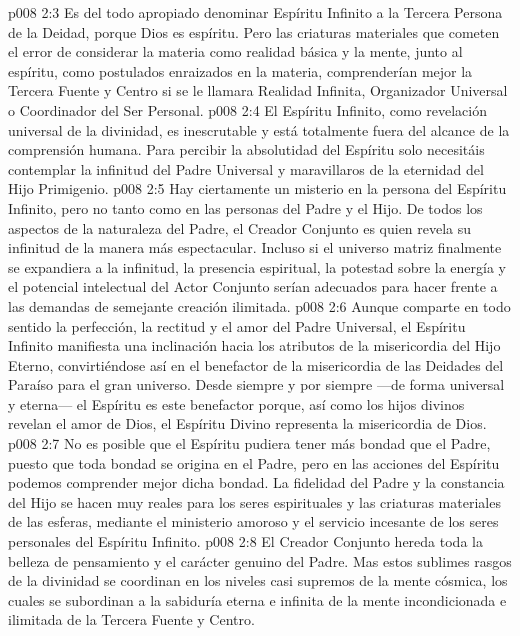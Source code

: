 \vs p008 2:3 Es del todo apropiado denominar Espíritu Infinito a la Tercera Persona de la Deidad, porque Dios es espíritu. Pero las criaturas materiales que cometen el error de considerar la materia como realidad básica y la mente, junto al espíritu, como postulados enraizados en la materia, comprenderían mejor la Tercera Fuente y Centro si se le llamara Realidad Infinita, Organizador Universal o Coordinador del Ser Personal.
\vs p008 2:4 \pc El Espíritu Infinito, como revelación universal de la divinidad, es inescrutable y está totalmente fuera del alcance de la comprensión humana. Para percibir la absolutidad del Espíritu solo necesitáis contemplar la infinitud del Padre Universal y maravillaros de la eternidad del Hijo Primigenio.
\vs p008 2:5 \pc Hay ciertamente un misterio en la persona del Espíritu Infinito, pero no tanto como en las personas del Padre y el Hijo. De todos los aspectos de la naturaleza del Padre, el Creador Conjunto es quien revela su infinitud de la manera más espectacular. Incluso si el universo matriz finalmente se expandiera a la infinitud, la presencia espiritual, la potestad sobre la energía y el potencial intelectual del Actor Conjunto serían adecuados para hacer frente a las demandas de semejante creación ilimitada.
\vs p008 2:6 Aunque comparte en todo sentido la perfección, la rectitud y el amor del Padre Universal, el Espíritu Infinito manifiesta una inclinación hacia los atributos de la misericordia del Hijo Eterno, convirtiéndose así en el benefactor de la misericordia de las Deidades del Paraíso para el gran universo. Desde siempre y por siempre ---de forma universal y eterna--- el Espíritu es este benefactor porque, así como los hijos divinos revelan el amor de Dios, el Espíritu Divino representa la misericordia de Dios.
\vs p008 2:7 No es posible que el Espíritu pudiera tener más bondad que el Padre, puesto que toda bondad se origina en el Padre, pero en las acciones del Espíritu podemos comprender mejor dicha bondad. La fidelidad del Padre y la constancia del Hijo se hacen muy reales para los seres espirituales y las criaturas materiales de las esferas, mediante el ministerio amoroso y el servicio incesante de los seres personales del Espíritu Infinito.
\vs p008 2:8 El Creador Conjunto hereda toda la belleza de pensamiento y el carácter genuino del Padre. Mas estos sublimes rasgos de la divinidad se coordinan en los niveles casi supremos de la mente cósmica, los cuales se subordinan a la sabiduría eterna e infinita de la mente incondicionada e ilimitada de la Tercera Fuente y Centro.
